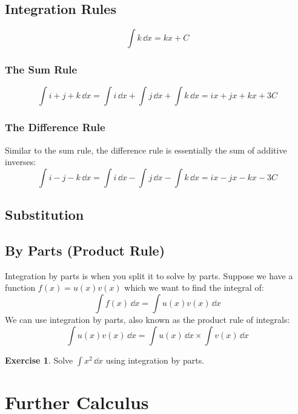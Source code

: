 \documentclass[a4paper]{article}
\theoremstyle{plain}
\theoremstyle{definition}
\newtheorem{exercise}{Exercise}[section]
\theoremstyle{remark}
\newcommand{\sectionSpace}{\vspace{2em}} %
\newcommand{\subsectionSpace}{\vspace{0.5em}}
\begin{document}
    \subsection{Integration Rules}
    $$\int k\,\dd{x} = kx + C$$
        \subsubsection{The Sum Rule}
        $$\int i + j + k\,\dd{x} = \int i\,\dd{x} + \int j\,\dd{x} + \int k\,\dd{x} = ix + jx + kx + 3C$$

        \subsubsection{The Difference Rule}
        Similar to the sum rule, the difference rule is essentially the sum of additive inverses:
        $$\int i - j - k\,\dd{x} = \int i\,\dd{x} - \int j\,\dd{x} - \int k\,\dd{x} = ix - jx - kx - 3C$$

    \subsectionSpace
    \subsection{Substitution}
    
    \subsectionSpace
    \subsection{By Parts (Product Rule)}
    Integration by parts is when you split it to solve by parts. Suppose we have a function $f(x) = u(x)v(x)$ which we want to find the integral of:
    $$\int f(x) \,\dd{x} = \int u(x)v(x) \,\dd{x}$$
    We can use integration by parts, also known as the product rule of integrals:
    $$\int u(x)v(x)\,\dd{x} = \int u(x)\,\dd{x}\times \int v(x)\,\dd{x}$$

    \begin{exercise}
        Solve $\int x^2\,\dd{x}$ using integration by parts.
    \end{exercise}


\sectionSpace
\section{Further Calculus}
\end{document}
